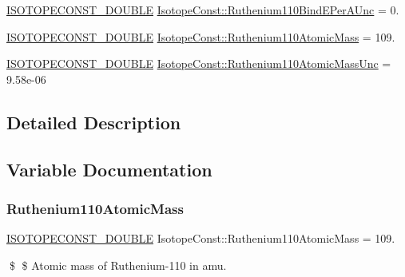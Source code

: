 \begin{DoxyCompactItemize}
\mbox{\hyperlink{group___isotope_const-_macros_ga8f45a7272ce02c0b4c65c44636ed719a}{I\+S\+O\+T\+O\+P\+E\+C\+O\+N\+S\+T\+\_\+\+D\+O\+U\+B\+LE}} \mbox{\hyperlink{group___isotope_const-_ruthenium-_ru110_ga01c92e69b80b1b00a2ea5f8254d729b2}{Isotope\+Const\+::\+Ruthenium110\+Bind\+E\+Per\+A\+Unc}} = 0.
\item 
\mbox{\hyperlink{group___isotope_const-_macros_ga8f45a7272ce02c0b4c65c44636ed719a}{I\+S\+O\+T\+O\+P\+E\+C\+O\+N\+S\+T\+\_\+\+D\+O\+U\+B\+LE}} \mbox{\hyperlink{group___isotope_const-_ruthenium-_ru110_ga8faa25faf2f0c35944abc884ab913382}{Isotope\+Const\+::\+Ruthenium110\+Atomic\+Mass}} = 109.
\item 
\mbox{\hyperlink{group___isotope_const-_macros_ga8f45a7272ce02c0b4c65c44636ed719a}{I\+S\+O\+T\+O\+P\+E\+C\+O\+N\+S\+T\+\_\+\+D\+O\+U\+B\+LE}} \mbox{\hyperlink{group___isotope_const-_ruthenium-_ru110_ga051bdb2178ae2363af906c87154d1edb}{Isotope\+Const\+::\+Ruthenium110\+Atomic\+Mass\+Unc}} = 9.\+58e-\/06
\end{DoxyCompactItemize}


\subsection{Detailed Description}


\subsection{Variable Documentation}
\mbox{\label{group___isotope_const-_ruthenium-_ru110_ga8faa25faf2f0c35944abc884ab913382}} 
\subsubsection{\texorpdfstring{Ruthenium110\+Atomic\+Mass}{Ruthenium110AtomicMass}}
{\footnotesize\ttfamily \mbox{\hyperlink{group___isotope_const-_macros_ga8f45a7272ce02c0b4c65c44636ed719a}{I\+S\+O\+T\+O\+P\+E\+C\+O\+N\+S\+T\+\_\+\+D\+O\+U\+B\+LE}} Isotope\+Const\+::\+Ruthenium110\+Atomic\+Mass = 109.}

\$ \$ Atomic mass of Ruthenium-\/110 in amu. \mbox{\label{group___isotope_const-_ruthenium-_ru110_ga051bdb2178ae2363af906c87154d1edb}} 
